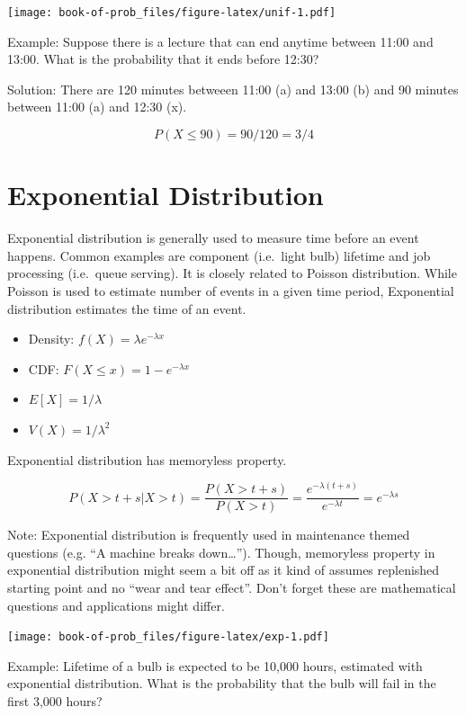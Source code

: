 \documentclass[]{book}
\theoremstyle{definition}
\theoremstyle{definition}
\theoremstyle{definition}
\theoremstyle{remark}
\begin{document}
\texttt{[image: book-of-prob\_files/figure-latex/unif-1.pdf]}

Example: Suppose there is a lecture that can end anytime between 11:00
and 13:00. What is the probability that it ends before 12:30?

Solution: There are 120 minutes betweeen 11:00 (a) and 13:00 (b) and 90
minutes between 11:00 (a) and 12:30 (x).

\[P(X \le 90) = 90/120 = 3/4\]

\hypertarget{exponential-distribution}{%
\section{Exponential Distribution}\label{exponential-distribution}}

Exponential distribution is generally used to measure time before an
event happens. Common examples are component (i.e.~light bulb) lifetime
and job processing (i.e.~queue serving). It is closely related to
Poisson distribution. While Poisson is used to estimate number of events
in a given time period, Exponential distribution estimates the time of
an event.

\begin{itemize}
\item
  Density: \(f(X) = \lambda e^{-\lambda x}\)
\item
  CDF: \(F(X \le x) = 1 - e^{-\lambda x}\)
\item
  \(E[X] = 1/\lambda\)
\item
  \(V(X) = 1/\lambda^2\)
\end{itemize}

Exponential distribution has memoryless property.

\[P(X > t + s | X > t) = \dfrac{P(X > t + s)}{P(X > t)} = \dfrac{e^{-\lambda (t+s)}}{e^{-\lambda t}} = e^{-\lambda s}\]

Note: Exponential distribution is frequently used in maintenance themed
questions (e.g. ``A machine breaks down\ldots{}''). Though, memoryless
property in exponential distribution might seem a bit off as it kind of
assumes replenished starting point and no ``wear and tear effect''.
Don't forget these are mathematical questions and applications might
differ.

\texttt{[image: book-of-prob\_files/figure-latex/exp-1.pdf]}

Example: Lifetime of a bulb is expected to be 10,000 hours, estimated
with exponential distribution. What is the probability that the bulb
will fail in the first 3,000 hours?
\end{document}

